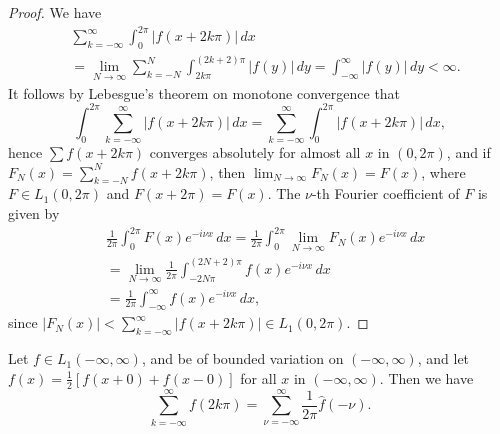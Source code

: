 \begin{proof}
We have
\begin{equation*}
\begin{aligned}
&\sum_{k=-\infty}^{\infty}  \int_0^{2\pi}|f(x+2k\pi)|\,dx\\
&= \lim_{N\to\infty}\sum_{k=-N}^{N}  \int_{2k\pi}^{(2k+2)\pi}|f(y)|\,dy = \int_{-\infty}^{\infty}|f(y)|\,dy < \infty.
\end{aligned}
\end{equation*}
It follows by Lebesgue's theorem on monotone convergence that
\begin{equation*}
\int_0^{2\pi}\sum_{k=-\infty}^{\infty}|f(x+2k\pi)|\,dx
=\sum_{k=-\infty}^{\infty}\int_0^{2\pi}|f(x+2k\pi)|\,dx,
\end{equation*}
hence $\sum f(x+2k\pi)$ converges absolutely for almost all $x$ in $(0,2\pi)$, and if $F_N(x)=\sum_{k=-N}^{N}f(x+2k\pi)$, then $\lim_{N\to\infty}F_N(x)=F(x)$, where $F\in L_1(0,2\pi)$ and $F(x+2\pi)=F(x)$. The $\nu$-th Fourier coefficient of $F$ is given by
\begin{align*}
&\frac{1}{2\pi}\int_0^{2\pi}F(x)e^{-i\nu x}\,dx
=\frac{1}{2\pi}\int_0^{2\pi}\lim_{N\to\infty}F_N(x)e^{-i\nu x}\,dx\\
&=\lim_{N\to\infty}\frac{1}{2\pi}\int_{-2N\pi}^{(2N+2)\pi}f(x)e^{-i\nu x}\,dx\\
&=\frac{1}{2\pi}\int_{-\infty}^{\infty}f(x)e^{-i\nu x}\,dx,
\end{align*}
since $|F_N(x)|<\sum_{k=-\infty}^{\infty}|f(x+2k\pi)|\in L_1(0,2\pi)$.
\end{proof}

\begin{theorem}\label{thm:I-6}
Let $f\in L_1(-\infty,\infty)$, and be of bounded variation on $(-\infty,\infty)$, and let $f(x)=\frac12[f(x+0)+f(x-0)]$ for all $x$ in $(-\infty,\infty)$. Then we have
\begin{equation}\label{eq:I-5.5}
\sum_{k=-\infty}^{\infty}f(2k\pi)
=\sum_{\nu=-\infty}^{\infty}\frac{1}{2\pi}\hat f(-\nu).
\end{equation}
\end{theorem}


